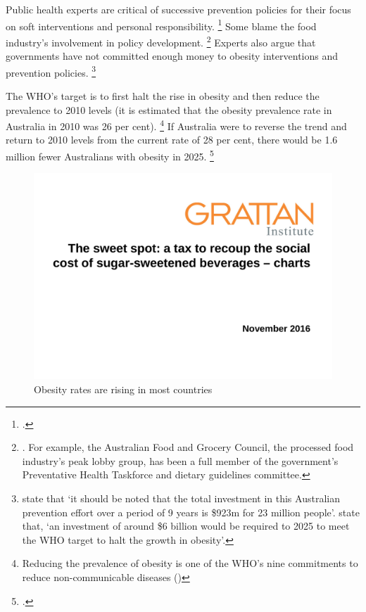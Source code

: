 \documentclass[embargoed]{grattan}
\begin{document}
Public health experts are critical of successive prevention policies for their focus on soft interventions and personal responsibility.%
\footcites{Capacci2012Policiespromotehealthy}{Swinburn2013Progressobesityprevention}{Australia2015NoTimeWeight} Some blame the food industry's involvement in policy development.%
\footnote{\textcites{Swinburn2013Progressobesityprevention}{Roberto2015Patchyprogressobesity}{Brownell2009perilsignoringhistory}.
For example, the Australian Food and Grocery Council, the processed food industry's peak lobby group, has been a full member of the government's Preventative Health Taskforce and dietary guidelines committee.} Experts also argue that governments have not committed enough money to obesity interventions and prevention policies.%
\footnote{\textcite{Swinburn2013Progressobesityprevention} state that `it should be noted that the total investment in this Australian prevention effort over a period of 9 years is \$923m for 23 million people'. \textcite{Australia2015NoTimeWeight} state that, `an investment of around \$6 billion would be required to 2025 to meet the WHO target to halt the growth in obesity'.}

The WHO's target is to first halt the rise in obesity and then reduce the prevalence to 2010 levels (it is estimated that the obesity prevalence rate in Australia in 2010 was 26 per cent).%
\footnote{Reducing the prevalence of obesity is one of the WHO's nine commitments to reduce non-communicable diseases (\textcites{Organization2013GlobalActionPlan}{Organization2016ObesityoverweightFact})} If Australia were to reverse the trend and return to 2010 levels from the current rate of 28 per cent, there would be 1.6 million fewer Australians with obesity in 2025.%
\footcite{Australia2015NoTimeWeight}


\begin{figure}
\caption{Obesity rates are rising in most countries }

\includegraphics[page=3]{atlas/ObesityCharts}


\end{figure}
\end{document}
